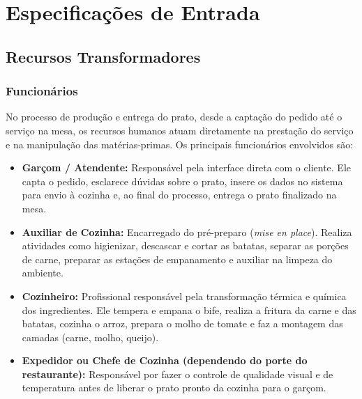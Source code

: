 \documentclass[12pt, a4paper]{article}
\begin{document}
%
%
%
%



\section{Especificações de Entrada}

\subsection{Recursos Transformadores}

\subsubsection*{Funcionários}

No processo de produção e entrega do prato, desde a captação do pedido até o serviço na mesa, os recursos humanos atuam diretamente na prestação do serviço e na manipulação das matérias-primas. Os principais funcionários envolvidos são:

\begin{itemize}
    \item \textbf{Garçom / Atendente:} Responsável pela interface direta com o cliente. Ele capta o pedido, esclarece dúvidas sobre o prato, insere os dados no sistema para envio à cozinha e, ao final do processo, entrega o prato finalizado na mesa.
    \item \textbf{Auxiliar de Cozinha:} Encarregado do pré-preparo (\textit{mise en place}). Realiza atividades como higienizar, descascar e cortar as batatas, separar as porções de carne, preparar as estações de empanamento e auxiliar na limpeza do ambiente.
    \item \textbf{Cozinheiro:} Profissional responsável pela transformação térmica e química dos ingredientes. Ele tempera e empana o bife, realiza a fritura da carne e das batatas, cozinha o arroz, prepara o molho de tomate e faz a montagem das camadas (carne, molho, queijo).
    \item \textbf{Expedidor ou Chefe de Cozinha (dependendo do porte do restaurante):} Responsável por fazer o controle de qualidade visual e de temperatura antes de liberar o prato pronto da cozinha para o garçom.
\end{itemize}
\end{document}
